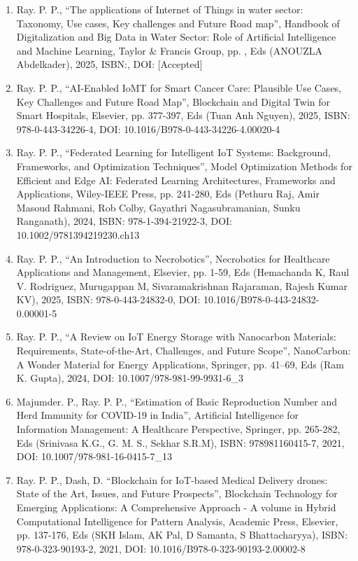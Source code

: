 \documentclass[11pt,a4paper]{moderncv}
\begin{document}
\begin{adjustwidth}{6em}{0pt}
	\begin{enumerate}
		
		\item	Ray. P. P., “The applications of Internet of Things in water sector: Taxonomy, Use cases, Key challenges and Future Road map”, Handbook of Digitalization and Big Data in Water Sector: Role of Artificial Intelligence and Machine Learning, Taylor \& Francis Group, pp. , Eds (ANOUZLA Abdelkader), 2025, ISBN:, DOI: [Accepted]
		
		\item Ray. P. P., “AI-Enabled IoMT for Smart Cancer Care: Plausible Use Cases, Key Challenges and Future Road Map”, Blockchain and Digital Twin for Smart Hospitals, Elsevier, pp. 377-397, Eds (Tuan Anh Nguyen), 2025, ISBN: 978-0-443-34226-4, DOI: 10.1016/B978-0-443-34226-4.00020-4
		
		\item Ray. P. P., “Federated Learning for Intelligent IoT Systems: Background, Frameworks, and Optimization Techniques”, Model Optimization Methods for Efficient and Edge AI: Federated Learning Architectures, Frameworks and Applications, Wiley-IEEE Press, pp. 241-280, Eds (Pethuru Raj, Amir Masoud Rahmani, Rob Colby, Gayathri Nagasubramanian, Sunku Ranganath), 2024, ISBN: 978-1-394-21922-3, DOI: 10.1002/9781394219230.ch13 
		
		\item Ray. P. P., “An Introduction to Necrobotics”, Necrobotics for Healthcare Applications and Management, Elsevier, pp. 1-59, Eds (Hemachanda K, Raul V. Rodriguez, Murugappan M, Sivaramakrishnan Rajaraman, Rajesh Kumar KV), 2025, ISBN: 978-0-443-24832-0, DOI: 10.1016/B978-0-443-24832-0.00001-5
		
		\item Ray. P. P., “A Review on IoT Energy Storage with Nanocarbon Materials: Requirements, State-of-the-Art, Challenges, and Future Scope”, NanoCarbon: A Wonder Material for Energy Applications, Springer, pp. 41–69, Eds (Ram K. Gupta), 2024, DOI: 10.1007/978-981-99-9931-6\_3
		
		\item Majumder. P., Ray. P. P., “Estimation of Basic Reproduction Number and Herd Immunity for COVID-19 in India”, Artificial Intelligence for Information Management: A Healthcare Perspective, Springer, pp. 265-282, Eds (Srinivasa K.G., G. M. S., Sekhar S.R.M), ISBN: 978981160415-7, 2021, DOI: 10.1007/978-981-16-0415-7\_13
		
		\item Ray. P. P., Dash, D. “Blockchain for IoT-based Medical Delivery drones: State of the Art, Issues, and Future Prospects”, Blockchain Technology for Emerging Applications: A Comprehensive Approach - A volume in Hybrid Computational Intelligence for Pattern Analysis, Academic Press, Elsevier, pp. 137-176, Eds (SKH Islam, AK Pal, D Samanta, S Bhattacharyya), ISBN:  978-0-323-90193-2, 2021, DOI: 10.1016/B978-0-323-90193-2.00002-8
		
		
	\end{enumerate}
\end{adjustwidth}
\end{document}
